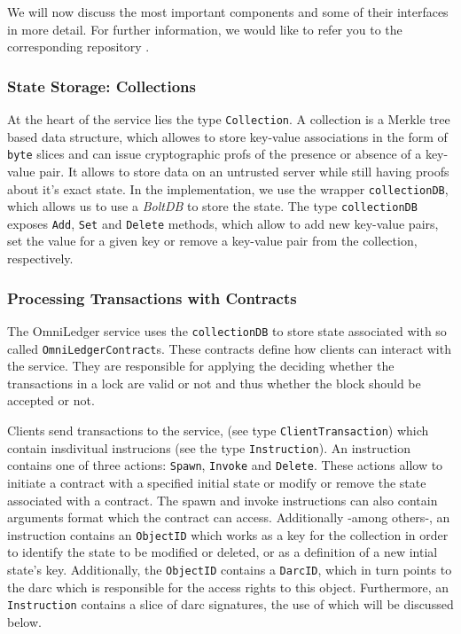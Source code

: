 \documentclass[11pt, a4paper, twoside, openright]{article} %
\begin{document}
We will now discuss the most important components and some of their interfaces
in more detail. For further information, we would like to refer you to the
corresponding repository \cite{omni}.

\subsubsection{State Storage: Collections}
At the heart of the service lies the type \texttt{Collection}. A collection is
a Merkle tree based data structure, which allowes to store key-value
associations in the form of \texttt{byte} slices and can issue cryptographic
profs of the presence or absence of a key-value pair. It allows to store data
on an untrusted server while still having proofs about it's exact state.
In the implementation, we use the wrapper \texttt{collectionDB}, which allows
us to use a \textit{BoltDB} \cite{bbolt} to store the state.
The type \texttt{collectionDB} exposes \texttt{Add}, \texttt{Set} and
\texttt{Delete} methods, which allow to add new key-value pairs, set the value
for a given key or remove a key-value pair from the collection, respectively.

\subsubsection{Processing Transactions with Contracts}
The OmniLedger service uses the \texttt{collectionDB} to store state associated
with so called \texttt{OmniLedgerContract}s. These contracts define how clients
can interact with the service. They are responsible for applying the deciding
whether the transactions in a lock are valid or not and thus whether the block
should be accepted or not.

Clients send transactions to the service, (see type \texttt{ClientTransaction})
which contain insdivitual instrucions (see the type \texttt{Instruction}).
An instruction contains one of three actions:
\texttt{Spawn}, \texttt{Invoke} and \texttt{Delete}.
These actions allow to initiate a contract with a specified initial state or 
modify or remove the state associated with a contract. 
The spawn and invoke instructions can also contain arguments
format which the contract can access.
Additionally -among others-, an instruction contains an
\texttt{ObjectID} which
works as a key for the collection in order to identify the state to
be modified or deleted, or as a definition of a new intial state's key.
Additionally, the \texttt{ObjectID} contains a \texttt{DarcID}, which in turn
points to the darc which is responsible for the access rights to this object.
Furthermore, an \texttt{Instruction} contains a slice of darc signatures, the
use of which will be discussed below.
\end{document}
